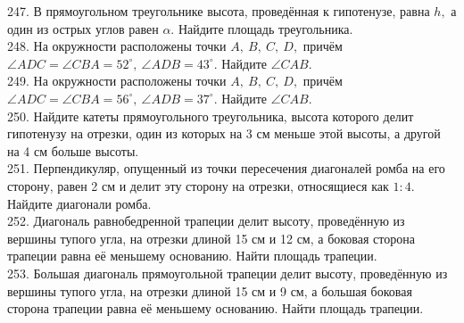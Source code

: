 \documentclass[12pt]{article}
\begin{document}
247. В прямоугольном треугольнике высота, проведённая к гипотенузе, равна $h,$ а один из острых
углов равен $\alpha.$ Найдите площадь треугольника.\\
248. На окружности расположены точки $A,\ B,\ C,\ D,$ причём $\angle ADC=\angle CBA=52^\circ,\
\angle ADB=43^\circ.$ Найдите $\angle CAB.$\\
249. На окружности расположены точки $A,\ B,\ C,\ D,$ причём $\angle ADC=\angle CBA=56^\circ,\
\angle ADB=37^\circ.$ Найдите $\angle CAB.$\\
250. Найдите катеты прямоугольного треугольника, высота
которого делит гипотенузу на отрезки, один из которых
на 3 см меньше этой высоты, а другой на 4 см больше
высоты.\\
251. Перпендикуляр, опущенный из точки пересечения
диагоналей ромба на его сторону, равен 2 см и делит эту
сторону на отрезки, относящиеся как $1:4.$ Найдите
диагонали ромба.\\
252. Диагональ равнобедренной трапеции делит высоту,
проведённую из вершины тупого угла, на отрезки длиной
15 см и 12 см, а боковая сторона трапеции равна её
меньшему основанию. Найти площадь трапеции.\\
253. Большая диагональ прямоугольной трапеции делит
высоту, проведённую из вершины тупого угла, на отрезки
длиной 15 см и 9 см, а большая боковая сторона трапеции
равна её меньшему основанию. Найти площадь
трапеции.
\newpage
\end{document}
